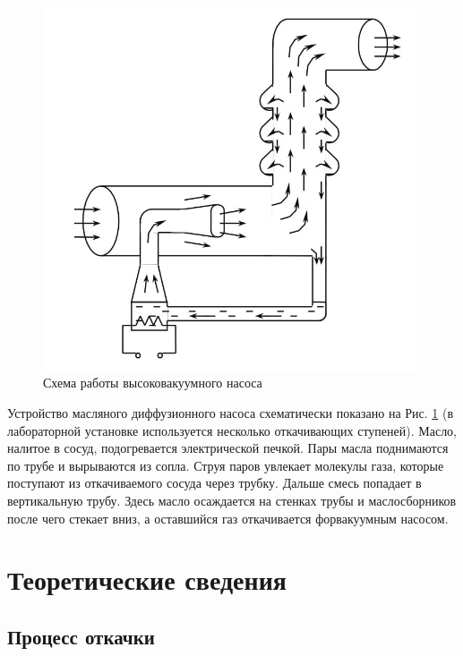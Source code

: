 \documentclass[a4paper,12pt]{article}
\theoremstyle{definition}
\begin{document}
	\begin{figure}
		\centering
		\includegraphics[width=1\linewidth]{pump}
		\caption{Схема работы высоковакуумного насоса}\label{pump}
	\end{figure}
	
	Устройство масляного диффузионного насоса схематически показано на Рис. \ref{pump} (в лабораторной установке используется несколько откачивающих ступеней). Масло, налитое в сосуд, подогревается электрической печкой. Пары масла поднимаются по трубе и вырываются из сопла. Струя паров увлекает молекулы газа, которые поступают из откачиваемого сосуда через трубку. Дальше смесь попадает в вертикальную трубу. Здесь масло осаждается на стенках трубы и маслосборников после чего стекает вниз, а оставшийся газ откачивается форвакуумным насосом. 
	
	\section{Теоретические сведения}
	\subsection{Процесс откачки}
	
\end{document}

